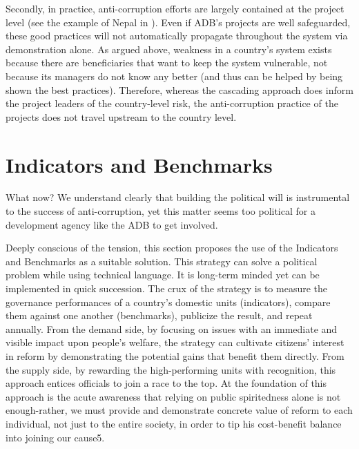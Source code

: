 \documentclass[12pt]{article}
\begin{document}
Secondly, in practice, anti-corruption efforts are largely contained at the project level (see the example of Nepal in \citealp[15]{ADB2013}). Even if ADB's projects are well safeguarded, these good practices will not automatically propagate throughout the system via demonstration alone. As argued above, weakness in a country's system exists because there are beneficiaries that want to keep the system vulnerable, not because its managers do not know any better (and thus can be helped by being shown the best practices). Therefore, whereas the cascading approach does inform the project leaders of the country-level risk, the anti-corruption practice of the projects does not travel upstream to the country level.

\section{Indicators and Benchmarks}
\label{sec:IB}

What now? We understand clearly that building the political will is instrumental to the success of anti-corruption, yet this matter seems too political for a development agency like the ADB to get involved.

Deeply conscious of the tension, this section proposes the use of the Indicators and Benchmarks as a suitable solution. This strategy can solve a political problem while using technical language. It is long-term minded yet can be implemented in quick succession. The crux of the strategy is to measure the governance performances of a country's domestic units (indicators), compare them against one another (benchmarks), publicize the result, and repeat annually. From the demand side, by focusing on issues with an immediate and visible impact upon people's welfare, the strategy can cultivate citizens' interest in reform by demonstrating the potential gains that benefit them directly. From the supply side, by rewarding the high-performing units with recognition, this approach entices officials to join a race to the top. At the foundation of this approach is the acute awareness that relying on public spiritedness alone is not enough-rather, we must provide and demonstrate concrete value of reform to each individual, not just to the entire society, in order to tip his cost-benefit balance into joining our cause5.
\end{document}
